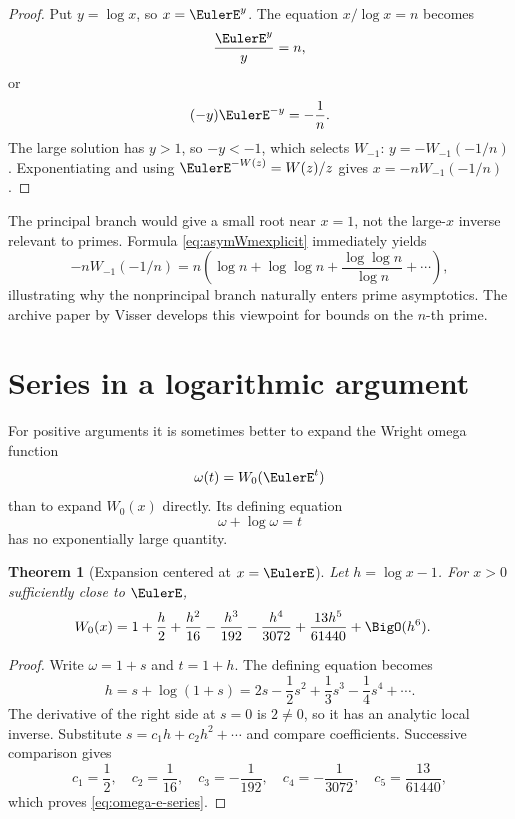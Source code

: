 \documentclass[11pt]{article}
\newtheorem{theorem}{Theorem}[section]
\theoremstyle{remark}
\begin{document}
\begin{proof}
Put \(y=\log x\), so \(x=\EulerE^y\).  The equation
\(x/\log x=n\) becomes
\[
       \frac{\EulerE^y}{y}=n,
\]
or
\[
       (-y)\EulerE^{-y}=-\frac1n.
\]
The large solution has \(y>1\), so \(-y<-1\), which selects \(W_{-1}\):
\(y=-W_{-1}(-1/n)\).  Exponentiating and using
\(\EulerE^{-W(z)}=W(z)/z\) gives
\(x=-nW_{-1}(-1/n)\).
\end{proof}

The principal branch would give a small root near \(x=1\), not the
large-\(x\) inverse relevant to primes.  Formula
\eqref{eq:asymWmexplicit} immediately yields
\[
 -nW_{-1}(-1/n)
 =n\left(\log n+\log\log n
 +\frac{\log\log n}{\log n}+\cdots\right),
\]
illustrating why the nonprincipal branch naturally enters prime asymptotics.
The archive paper by Visser develops this viewpoint for bounds on the
\(n\)-th prime.


\section{Series in a logarithmic argument}\label{sec:omega-series}

For positive arguments it is sometimes better to expand the Wright omega
function
\[
       \omega(t)=W_0(\EulerE^t)
\]
than to expand \(W_0(x)\) directly.  Its defining equation
\[
       \omega+\log\omega=t
\]
has no exponentially large quantity.

\begin{theorem}[Expansion centered at \(x=\EulerE\)]\label{thm:omega-e-series}
Let \(h=\log x-1\).  For \(x>0\) sufficiently close to \(\EulerE\),
\begin{align}
 W_0(x)
 ={}&1+\frac h2+\frac{h^2}{16}
 -\frac{h^3}{192}-\frac{h^4}{3072}
 +\frac{13h^5}{61440}
 +\BigO(h^6).\label{eq:omega-e-series}
\end{align}
\end{theorem}

\begin{proof}
Write \(\omega=1+s\) and \(t=1+h\).  The defining equation becomes
\[
       h=s+\log(1+s)
        =2s-\frac12s^2+\frac13s^3-\frac14s^4+\cdots.
\]
The derivative of the right side at \(s=0\) is \(2\neq0\), so it has an
analytic local inverse.  Substitute
\(s=c_1h+c_2h^2+\cdots\) and compare coefficients.  Successive comparison
gives
\[
 c_1=\frac12,\quad c_2=\frac1{16},\quad
 c_3=-\frac1{192},\quad c_4=-\frac1{3072},\quad
 c_5=\frac{13}{61440},
\]
which proves \eqref{eq:omega-e-series}.
\end{proof}
\end{document}
